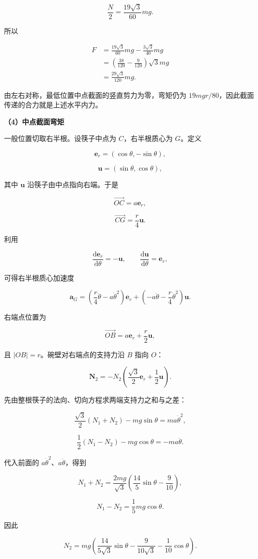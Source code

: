 \documentclass[12pt,a4paper,UTF8]{ctexart}
\begin{document}
\[\frac N2=\frac{19\sqrt3}{60}mg.\]

所以

\[\begin{aligned}
F
&=\frac{19\sqrt3}{60}mg-\frac{3\sqrt3}{40}mg\\
&=\left(\frac{38}{120}-\frac9{120}\right)\sqrt3mg\\
&=\boxed{\frac{29\sqrt3}{120}mg}.
\end{aligned}\]

由左右对称，最低位置中点截面的竖直剪力为零，弯矩仍为
\(19mgr/80\)，因此截面传递的合力就是上述水平内力。

\textbf{（4）中点截面弯矩}

一般位置切取右半根。设筷子中点为 \(C\)，右半根质心为 \(G\)。定义

\[\bm e_r=(\cos\theta,-\sin\theta),\]

\[\bm u=(\sin\theta,\cos\theta),\]

其中 \(\bm u\) 沿筷子由中点指向右端。于是

\[\overrightarrow{OC}=a\bm e_r,\]

\[\overrightarrow{CG}=\frac r4\bm u.\]

利用

\[\frac{\mathrm{d}\bm e_r}{\mathrm{d}\theta}=-\bm u,\qquad
\frac{\mathrm{d}\bm u}{\mathrm{d}\theta}=\bm e_r,\]

可得右半根质心加速度

\[\bm a_G=\left(\frac r4\ddot\theta-a\dot\theta^2\right)\bm e_r
+\left(-a\ddot\theta-\frac r4\dot\theta^2\right)\bm u.\]

右端点位置为

\[\overrightarrow{OB}=a\bm e_r+\frac r2\bm u,\]

且 \(|OB|=r\)。碗壁对右端点的支持力沿 \(B\) 指向 \(O\)：

\[\bm N_2=-N_2\left(\frac{\sqrt3}{2}\bm e_r+\frac12\bm u\right).\]

先由整根筷子的法向、切向方程求两端支持力之和与之差：

\[\frac{\sqrt3}{2}(N_1+N_2)-mg\sin\theta=ma\dot\theta^2,\]

\[\frac12(N_1-N_2)-mg\cos\theta=-ma\ddot\theta.\]

代入前面的 \(a\dot\theta^2\)、\(a\ddot\theta\)，得到

\[N_1+N_2=\frac{2mg}{\sqrt3}\left(\frac{14}{5}\sin\theta-\frac9{10}\right),\]

\[N_1-N_2=\frac15mg\cos\theta.\]

因此

\[N_2=mg\left(
\frac{14}{5\sqrt3}\sin\theta-
\frac{9}{10\sqrt3}-\frac1{10}\cos\theta
\right).\]
\end{document}
